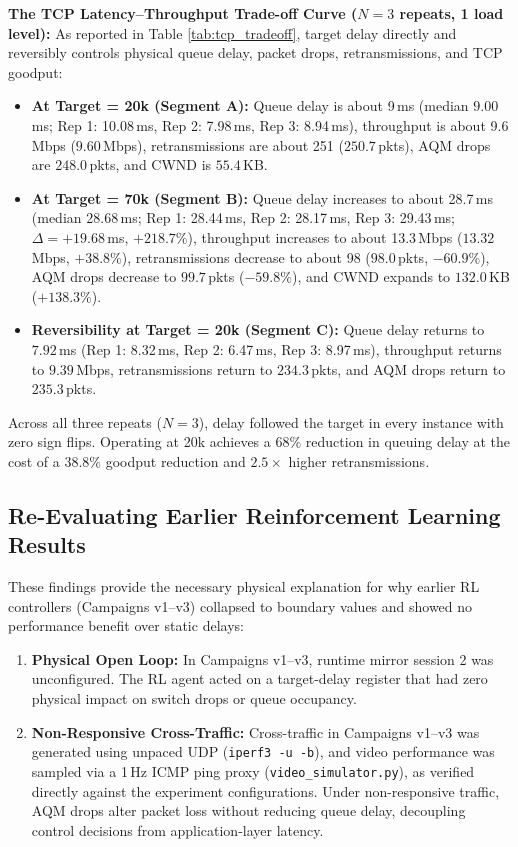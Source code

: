 \documentclass[12pt,a4paper,oneside]{report}
\begin{document}
\textbf{The TCP Latency--Throughput Trade-off Curve ($N=3$ repeats, 1 load level):}
As reported in Table \ref{tab:tcp_tradeoff}, target delay directly and reversibly controls physical queue delay, packet drops, retransmissions, and TCP goodput:
\begin{itemize}
  \item \textbf{At Target = 20k (Segment A):} Queue delay is about 9\,ms (median $9.00$\,ms; Rep 1: 10.08\,ms, Rep 2: 7.98\,ms, Rep 3: 8.94\,ms), throughput is about 9.6\,Mbps ($9.60$\,Mbps), retransmissions are about 251 ($250.7$\,pkts), AQM drops are $248.0$\,pkts, and CWND is $55.4$\,KB.
  \item \textbf{At Target = 70k (Segment B):} Queue delay increases to about 28.7\,ms (median $28.68$\,ms; Rep 1: 28.44\,ms, Rep 2: 28.17\,ms, Rep 3: 29.43\,ms; $\Delta = +19.68$\,ms, $+218.7\%$), throughput increases to about 13.3\,Mbps ($13.32$\,Mbps, $+38.8\%$), retransmissions decrease to about 98 ($98.0$\,pkts, $-60.9\%$), AQM drops decrease to $99.7$\,pkts ($-59.8\%$), and CWND expands to $132.0$\,KB ($+138.3\%$).
  \item \textbf{Reversibility at Target = 20k (Segment C):} Queue delay returns to $7.92$\,ms (Rep 1: 8.32\,ms, Rep 2: 6.47\,ms, Rep 3: 8.97\,ms), throughput returns to $9.39$\,Mbps, retransmissions return to $234.3$\,pkts, and AQM drops return to $235.3$\,pkts.
\end{itemize}
Across all three repeats ($N=3$), delay followed the target in every instance with zero sign flips. Operating at 20k achieves a $68\%$ reduction in queuing delay at the cost of a $38.8\%$ goodput reduction and $2.5\times$ higher retransmissions.

\subsection{Re-Evaluating Earlier Reinforcement Learning Results}
These findings provide the necessary physical explanation for why earlier RL controllers (Campaigns v1–v3) collapsed to boundary values and showed no performance benefit over static delays:
\begin{enumerate}[label=\arabic*.]
  \item \textbf{Physical Open Loop:} In Campaigns v1–v3, runtime mirror session 2 was unconfigured. The RL agent acted on a target-delay register that had zero physical impact on switch drops or queue occupancy.
  \item \textbf{Non-Responsive Cross-Traffic:} Cross-traffic in Campaigns v1–v3 was generated using unpaced UDP (\texttt{iperf3 -u -b}), and video performance was sampled via a 1\,Hz ICMP ping proxy (\texttt{video\_simulator.py}), as verified directly against the experiment configurations. Under non-responsive traffic, AQM drops alter packet loss without reducing queue delay, decoupling control decisions from application-layer latency.
\end{enumerate}
\end{document}
